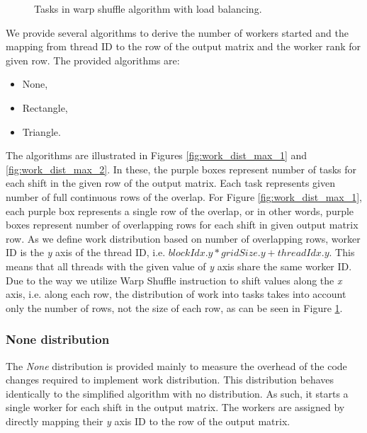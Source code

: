 \begin{figure}[ht]
	\centering
	\def\svgwidth{0.8\textwidth}
	
	\caption{Tasks in warp shuffle algorithm with load balancing.}
	\label{fig:warp_shuffle_work_dist_tasks}
\end{figure}


We provide several algorithms to derive the number of workers started and the mapping from thread ID to the row of the output matrix and the worker rank for given row. The provided algorithms are:

\begin{itemize}
	\item None,
	\item Rectangle,
	\item Triangle.
\end{itemize}


The algorithms are illustrated in Figures \ref{fig:work_dist_max_1} and \ref{fig:work_dist_max_2}. In these, the purple boxes represent number of tasks for each shift in the given row of the output matrix. Each task represents given number of full continuous rows of the overlap. For Figure \ref{fig:work_dist_max_1}, each purple box represents a single row of the overlap, or in other words, purple boxes represent number of overlapping rows for each shift in given output matrix row. As we define work distribution based on number of overlapping rows, worker ID is the \textit{y} axis of the thread ID, i.e. $blockIdx.y * gridSize.y + threadIdx.y$. This means that all threads with the given value of \textit{y} axis share the same worker ID. Due to the way we utilize Warp Shuffle instruction to shift values along the \textit{x} axis, i.e. along each row, the distribution of work into tasks takes into account only the number of rows, not the size of each row, as can be seen in Figure \ref{fig:warp_shuffle_work_dist_tasks}. 


\subsubsection{None distribution}		
The \textit{None} distribution is provided mainly to measure the overhead of the code changes required to implement work distribution. This distribution behaves identically to the simplified algorithm with no distribution. As such, it starts a single worker for each shift in the output matrix. The workers are assigned by directly mapping their \textit{y} axis ID to the row of the output matrix.

